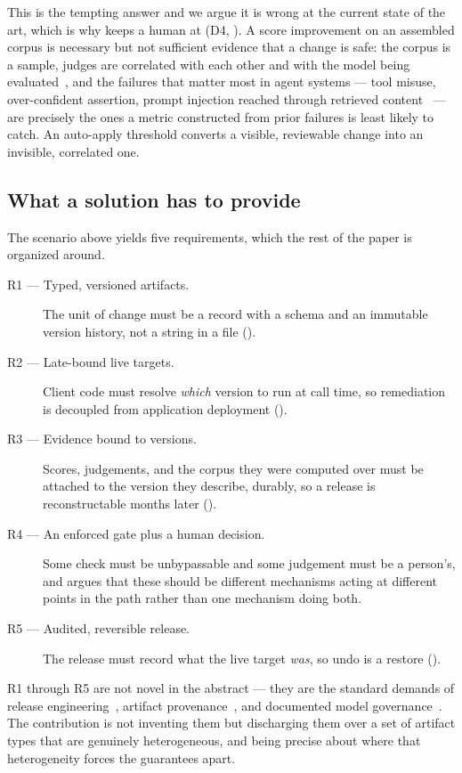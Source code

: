  This is the tempting answer and we argue it is
wrong at the current state of the art, which is why \sys keeps a human at
 (D4, ). A score improvement on an assembled
corpus is necessary but not sufficient evidence that a change is safe: the corpus
is a sample, judges are correlated with each other and with the model being
evaluated~\cite{zheng2023judging}, and the failures that matter most in agent
systems --- tool misuse, over-confident assertion, prompt injection reached
through retrieved content~\cite{greshake2023injection} --- are precisely the ones a
metric constructed from prior failures is least likely to catch. An auto-apply
threshold converts a visible, reviewable change into an invisible, correlated one.

\subsection{What a solution has to provide}

The scenario above yields five requirements, which the rest of the paper is
organized around.

\begin{description}
\item[R1 --- Typed, versioned artifacts.] The unit of change must be a record with
a schema and an immutable version history, not a string in a file
().

\item[R2 --- Late-bound live targets.] Client code must resolve \emph{which}
version to run at call time, so remediation is decoupled from application
deployment ().

\item[R3 --- Evidence bound to versions.] Scores, judgements, and the corpus they
were computed over must be attached to the version they describe, durably, so a
release is reconstructable months later ().

\item[R4 --- An enforced gate plus a human decision.] Some check must be
unbypassable and some judgement must be a person's, and 
argues that these should be different mechanisms acting at different points in the
path rather than one mechanism doing both.

\item[R5 --- Audited, reversible release.] The release must record what the live
target \emph{was}, so undo is a restore ().
\end{description}

R1 through R5 are not novel in the abstract --- they are the standard demands of
release engineering~\cite{humble2010cd}, artifact provenance~\cite{
torresarias2019intoto,slsa}, and documented model
governance~\cite{mitchell2019modelcards,gebru2021datasheets}. The contribution is
not inventing them but discharging them over a set of artifact types that are
genuinely heterogeneous, and being precise about where that heterogeneity forces
the guarantees apart.
